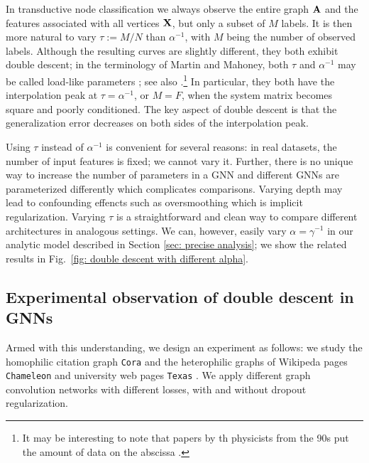 \documentclass[9pt,twocolumn]{pnas-new}
\newcommand{\idd}[1]{{#1}}
\begin{document}
In transductive node classification we always observe the entire graph $\mathbf{A}$ and the features associated with all vertices $\mathbf{X}$, but only a subset of $M$ labels. It is then more natural to vary $\tau := M/N$ than $\alpha^{-1}$, with $M$ being the number of observed labels. \idd{Although the resulting curves are slightly different, they both exhibit double descent; in the terminology of Martin and Mahoney, both $\tau$ and $\alpha^{-1}$ may be called load-like parameters \cite{martin2017rethinking}; see also \cite{yang2021taxonomizing}.}\footnote{It may be interesting to note that papers by th physicists from the 90s put the amount of data on the abscissa \cite{watkin1993statistical,opper1990ability}.} In particular, they both have the interpolation peak at $\tau = \alpha^{-1}$, or $M = F$, when the system matrix becomes square and poorly conditioned. The key aspect of double descent is that the generalization error decreases on both sides of the interpolation peak.

Using $\tau$ instead of $\alpha^{-1}$ is convenient for several reasons: in real datasets, the number of input features is fixed; we cannot vary it. Further, there is no unique way to increase the number of parameters in a GNN and different GNNs are parameterized differently which complicates comparisons. Varying depth may lead to confounding effencts such as oversmoothing which is implicit regularization. Varying $\tau$ is a straightforward and clean way to compare different architectures in analogous settings. We can, however, easily vary $\alpha = \gamma^{-1}$ in our analytic model described in Section \ref{sec: precise analysis}; we show the related results in Fig.~\ref{fig: double descent with different alpha}.


\subsection*{Experimental observation of double descent in GNNs}


Armed with this understanding, we design an experiment as follows: we study the homophilic citation graph \texttt{Cora} \cite{sen2008collective} and the heterophilic graphs of Wikipeda pages \texttt{Chameleon} \cite{rozemberczki2021multi} and university web pages \texttt{Texas} \cite{pei2020geom}. We apply different graph convolution networks with different losses, with and without dropout regularization.  
\end{document}
